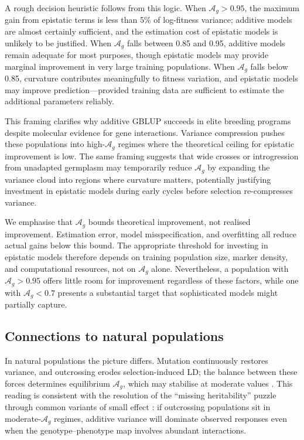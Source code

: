 \documentclass[9pt,twocolumn,twoside,lineno]{gsajnl}
\newcommand{\Ag}{\ensuremath{\mathcal{A}_{g}}\xspace}
\begin{document}
A rough decision heuristic follows from this logic. When $\mathcal{A}_g > 0.95$, the maximum gain from epistatic terms is less than 5\% of log-fitness variance; additive models are almost certainly sufficient, and the estimation cost of epistatic models is unlikely to be justified. When $\mathcal{A}_g$ falls between 0.85 and 0.95, additive models remain adequate for most purposes, though epistatic models may provide marginal improvement in very large training populations. When $\mathcal{A}_g$ falls below 0.85, curvature contributes meaningfully to fitness variation, and epistatic models may improve prediction---provided training data are sufficient to estimate the additional parameters reliably.

This framing clarifies why additive GBLUP succeeds in elite breeding programs despite molecular evidence for gene interactions. Variance compression pushes these populations into high-$\mathcal{A}_g$ regimes where the theoretical ceiling for epistatic improvement is low. The same framing suggests that wide crosses or introgression from unadapted germplasm may temporarily reduce $\mathcal{A}_g$ by expanding the variance cloud into regions where curvature matters, potentially justifying investment in epistatic models during early cycles before selection re-compresses variance.

We emphasise that $\mathcal{A}_g$ bounds theoretical improvement, not realised improvement. Estimation error, model misspecification, and overfitting all reduce actual gains below this bound. The appropriate threshold for investing in epistatic models therefore depends on training population size, marker density, and computational resources, not on $\mathcal{A}_g$ alone. Nevertheless, a population with $\mathcal{A}_g > 0.95$ offers little room for improvement regardless of these factors, while one with $\mathcal{A}_g < 0.7$ presents a substantial target that sophisticated models might partially capture.
\subsection{Connections to natural populations}

In natural populations the picture differs. Mutation continuously restores variance, and outcrossing erodes selection-induced LD; the balance between these forces determines equilibrium \Ag, which may stabilise at moderate values \citep{Turelli1988, TurelliBarton1994}. This reading is consistent with the resolution of the ``missing heritability'' puzzle \citep{Manolio2009} through common variants of small effect \citep{Yang2010, Yang2015, LopezCortegano2019}: if outcrossing populations sit in moderate-\Ag regimes, additive variance will dominate observed responses even when the genotype--phenotype map involves abundant interactions.
\end{document}
